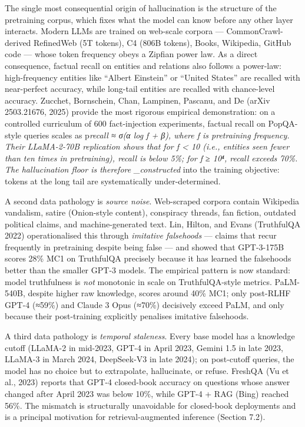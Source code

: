 The single most consequential origin of hallucination is the structure of the pretraining corpus, which fixes what the model can know before any other layer interacts. Modern LLMs are trained on web-scale corpora --- CommonCrawl-derived RefinedWeb (5T tokens), C4 (806B tokens), Books, Wikipedia, GitHub code --- whose token frequency obeys a Zipfian power law. As a direct consequence, factual recall on entities and relations also follows a power-law: high-frequency entities like ``Albert Einstein'' or ``United States'' are recalled with near-perfect accuracy, while long-tail entities are recalled with chance-level accuracy. Zucchet, Bornschein, Chan, Lampinen, Pascanu, and De (arXiv 2503.21676, 2025) provide the most rigorous empirical demonstration: on a controlled curriculum of 600 fact-injection experiments, factual recall on PopQA-style queries scales as p\emph{recall ≈ σ(α log f + β), where f is pretraining frequency. Their LLaMA-2-70B replication shows that for f \textless{} 10 (i.e., entities seen fewer than ten times in pretraining), recall is below 5\%; for f ≥ 10⁴, recall exceeds 70\%. The hallucination floor is therefore \_constructed} into the training objective: tokens at the long tail are systematically under-determined.

A second data pathology is \emph{source noise}. Web-scraped corpora contain Wikipedia vandalism, satire (Onion-style content), conspiracy threads, fan fiction, outdated political claims, and machine-generated text. Lin, Hilton, and Evans (TruthfulQA 2022) operationalised this through \emph{imitative falsehoods} --- claims that recur frequently in pretraining despite being false --- and showed that GPT-3-175B scores 28\% MC1 on TruthfulQA precisely because it has learned the falsehoods better than the smaller GPT-3 models. The empirical pattern is now standard: model truthfulness is \emph{not} monotonic in scale on TruthfulQA-style metrics. PaLM-540B, despite higher raw knowledge, scores around 40\% MC1; only post-RLHF GPT-4 (≈59\%) and Claude 3 Opus (≈70\%) decisively exceed PaLM, and only because their post-training explicitly penalises imitative falsehoods.

A third data pathology is \emph{temporal staleness}. Every base model has a knowledge cutoff (LLaMA-2 in mid-2023, GPT-4 in April 2023, Gemini 1.5 in late 2023, LLaMA-3 in March 2024, DeepSeek-V3 in late 2024); on post-cutoff queries, the model has no choice but to extrapolate, hallucinate, or refuse. FreshQA (Vu et al., 2023) reports that GPT-4 closed-book accuracy on questions whose answer changed after April 2023 was below 10\%, while GPT-4 + RAG (Bing) reached 56\%. The mismatch is structurally unavoidable for closed-book deployments and is a principal motivation for retrieval-augmented inference (Section 7.2).

